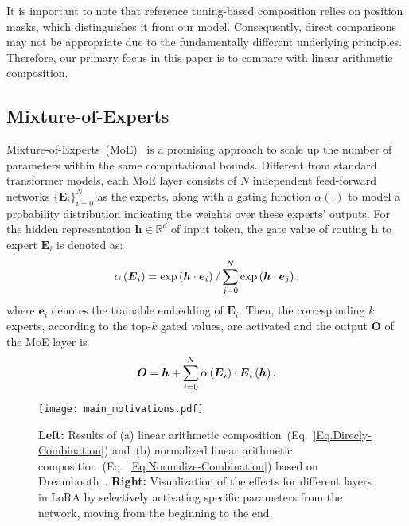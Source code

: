 It is important to note that reference tuning-based composition relies on position masks, which distinguishes it from our model. Consequently, direct comparisons may not be appropriate due to the fundamentally different underlying principles. Therefore, our primary focus in this paper is to compare \our{} with linear arithmetic composition.

\subsection{Mixture-of-Experts}
Mixture-of-Experts~(MoE)~\citep{moec} is a promising approach to scale up the number of parameters within the same computational bounds. 
Different from standard transformer models, each MoE layer consists of $N$ independent feed-forward networks $\{\boldsymbol{E}_i\}^{N}_{i=0}$ as the experts, along with a gating function $\alpha \left(\cdot\right)$ to model a probability distribution indicating the weights over these experts' outputs.
For the hidden representation $\boldsymbol{h} \in \mathbb{R}^{d}$ of input token, the gate value of routing $\boldsymbol{h}$ to expert $\boldsymbol{E}_i$ is denoted as:
\begin{equation}
\vspace{-2mm}
\alpha \left(\boldsymbol{E}_i\right) = \exp\left(\boldsymbol{h}\cdot\boldsymbol{e}_i\right) / \sum_{j=0}^{N}\exp\left(\boldsymbol{h}\cdot\boldsymbol{e}_j\right),
\end{equation}
where $\boldsymbol{e}_i$ denotes the trainable embedding of $\boldsymbol{E}_i$. Then, the corresponding $k$ experts, according to the top-$k$ gated values, are activated and the output $\boldsymbol{O}$ of the MoE layer is
\begin{equation}
\vspace{-2mm}
\boldsymbol{O} = \boldsymbol{h} + \sum_{i=0}^{N}\alpha \left(\boldsymbol{E}_i\right) \cdot \boldsymbol{E}_i\left(\boldsymbol{h}\right).
\vspace{-2mm}
\end{equation}

\begin{figure*}[!tb]
\centering
\texttt{[image: main\_motivations.pdf]}
\vspace{-2mm}
\caption{\textbf{Left:} Results of (a) linear arithmetic composition~(Eq.~\ref{Eq.Direcly-Combination}) and~(b) normalized linear arithmetic composition~(Eq.~\ref{Eq.Normalize-Combination}) based on Dreambooth~\citep{ruiz2023dreambooth}. \textbf{Right:} Visualization of the effects for different layers in LoRA by selectively activating specific parameters from the network, moving from the beginning to the end. 
}
\label{fig:Observation}
\vspace{-4mm}
\end{figure*}

